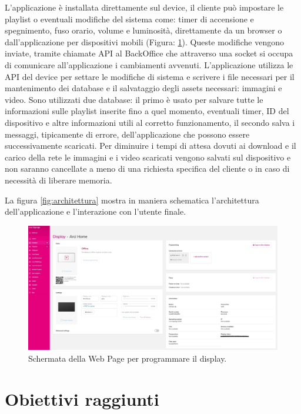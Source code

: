 L'applicazione è installata direttamente sul device, il cliente può impostare le playlist o eventuali modifiche del sistema come: timer di accensione e spegnimento, fuso orario, volume e luminosità, direttamente da un browser o dall'applicazione per dispositivi mobili (Figura: \ref*{fig:schermata-web}).\nl
Queste modifiche vengono inviate, tramite chiamate API al BackOffice che attraverso una socket si occupa di comunicare all'applicazione i cambiamenti avvenuti. 
L'applicazione utilizza le API del device per settare le modifiche di sistema e scrivere i file necessari per il mantenimento dei database e il salvataggio degli assets necessari: immagini e video. \n
Sono utilizzati due database: il primo è usato per salvare tutte le informazioni sulle playlist inserite fino a quel momento, eventuali timer, ID del dispositivo e altre informazioni utili al corretto funzionamento, il secondo salva i messaggi, tipicamente di errore, dell'applicazione che possono essere successivamente scaricati.\n
Per diminuire i tempi di attesa dovuti ai download e il carico della rete le immagini e i video scaricati vengono salvati sul dispositivo e non saranno cancellate a meno di una richiesta specifica del cliente o in caso di necessità di liberare memoria.\n

La figura \ref*{fig:architettura} mostra in maniera schematica l'architettura dell'applicazione e l'interazione con l'utente finale.

\begin{figure}[!htb]
    \centering
    \includegraphics[width= 1\textwidth]{images/Introduzione/SchermataWebLS.jpg} 
    \caption{Schermata della Web Page per programmare il display.} 
    \label{fig:schermata-web}
\end{figure}

\section{Obiettivi raggiunti}

